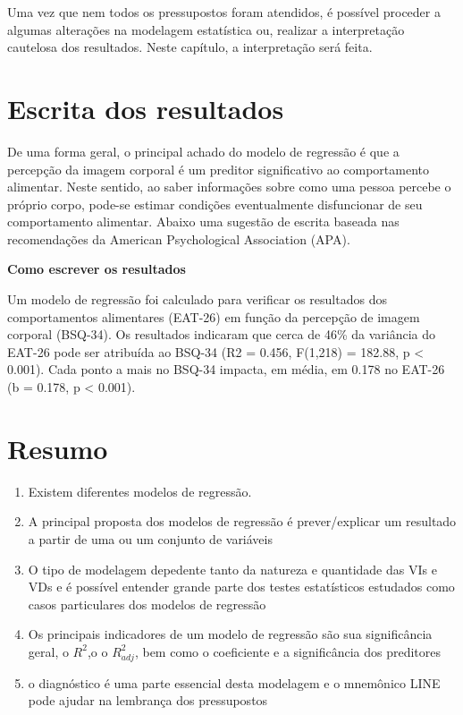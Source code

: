 \documentclass[
]{book}
\providecommand{\tightlist}{%
  \setlength{\itemsep}{0pt}\setlength{\parskip}{0pt}}
\begin{document}
Uma vez que nem todos os pressupostos foram atendidos, é possível proceder a algumas alterações na modelagem estatística ou, realizar a interpretação cautelosa dos resultados. Neste capítulo, a interpretação será feita.

\hypertarget{escrita-dos-resultados-12}{%
\section{Escrita dos resultados}\label{escrita-dos-resultados-12}}

De uma forma geral, o principal achado do modelo de regressão é que a percepção da imagem corporal é um preditor significativo ao comportamento alimentar. Neste sentido, ao saber informações sobre como uma pessoa percebe o próprio corpo, pode-se estimar condições eventualmente disfuncionar de seu comportamento alimentar. Abaixo uma sugestão de escrita baseada nas recomendações da American Psychological Association (APA).

\begin{writing}
\textbf{Como escrever os resultados}

Um modelo de regressão foi calculado para verificar os resultados dos
comportamentos alimentares (EAT-26) em função da percepção de imagem
corporal (BSQ-34). Os resultados indicaram que cerca de 46\% da
variância do EAT-26 pode ser atribuída ao BSQ-34 (R2 = 0.456, F(1,218) =
182.88, p \textless{} 0.001). Cada ponto a mais no BSQ-34 impacta, em
média, em 0.178 no EAT-26 (b = 0.178, p \textless{} 0.001).
\end{writing}

\hypertarget{resumo-12}{%
\section{Resumo}\label{resumo-12}}

\begin{explore}

\begin{enumerate}
\def\labelenumi{\arabic{enumi}.}
\tightlist
\item
  Existem diferentes modelos de regressão.
\item
  A principal proposta dos modelos de regressão é prever/explicar um resultado a partir de uma ou um conjunto de variáveis\\
\item
  O tipo de modelagem depedente tanto da natureza e quantidade das VIs e VDs e é possível entender grande parte dos testes estatísticos estudados como casos particulares dos modelos de regressão\\
\item
  Os principais indicadores de um modelo de regressão são sua significância geral, o \(R^2\),o o \(R^2_{adj}\), bem como o coeficiente e a significância dos preditores\\
\item
  o diagnóstico é uma parte essencial desta modelagem e o mnemônico LINE pode ajudar na lembrança dos pressupostos\\
\end{enumerate}

\end{explore}
\end{document}
